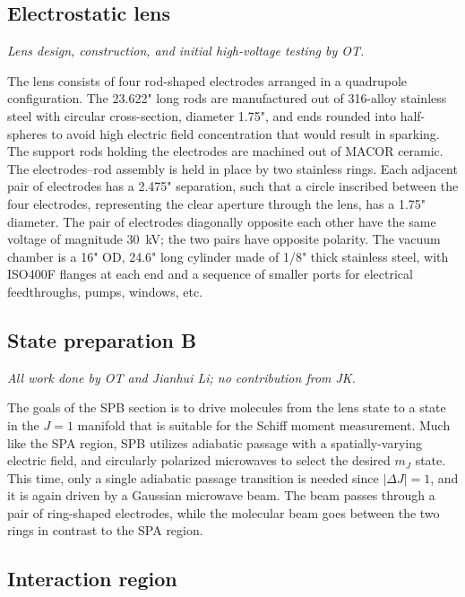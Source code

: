 \subsection{Electrostatic lens}

\textit{Lens design, construction, and initial high-voltage testing by OT.}

The lens \cite[ch.~8]{timgren2023thesis} consists of four rod-shaped electrodes
arranged in a quadrupole configuration. The 23.622" long rods are manufactured
out of 316-alloy stainless steel with circular cross-section, diameter 1.75",
and ends rounded into half-spheres to avoid high electric field concentration
that would result in sparking. The support rods holding the electrodes are
machined out of MACOR ceramic. The electrodes--rod assembly is held in place by
two stainless rings. Each adjacent pair of electrodes has a 2.475" separation,
such that a circle inscribed between the four electrodes, representing the clear
aperture through the lens, has a 1.75" diameter. The pair of electrodes
diagonally opposite each other have the same voltage of magnitude 30~kV; the two
pairs have opposite polarity. The vacuum chamber is a 16" OD, 24.6" long
cylinder made of 1/8" thick stainless steel, with ISO400F flanges at each end
and a sequence of smaller ports for electrical feedthroughs, pumps, windows,
etc.

\subsection{State preparation B}

\textit{All work done by OT and Jianhui Li; no contribution from JK.}

The goals of the SPB section \cite[ch.~9]{timgren2023thesis} is to drive
molecules from the lens state to a state in the $J=1$ manifold that is suitable
for the Schiff moment measurement.  Much like the SPA region, SPB utilizes
adiabatic passage with a spatially-varying electric field, and circularly
polarized microwaves to select the desired $m_J$ state. This time, only a single
adiabatic passage transition is needed since $|\Delta J|=1$, and it is again
driven by a Gaussian microwave beam. The beam passes through a pair of
ring-shaped electrodes, while the molecular beam goes between the two rings in
contrast to the SPA region.

\subsection{Interaction region}


